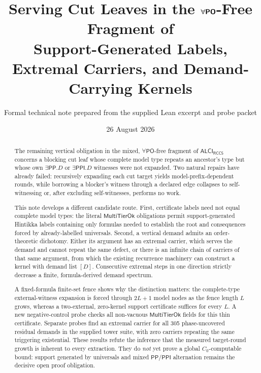 \documentclass[11pt,letterpaper]{article}
\title{\vspace{-1.5em}\textbf{Serving Cut Leaves in the $\boldsymbol{\forall\PO}$-Free Fragment of \ALCIRCC}\\[0.5em]
\large Support-Generated Labels, Extremal Carriers, and Demand-Carrying Kernels}
\author{Formal technical note prepared from the supplied Lean excerpt and probe packet}
\date{26 August 2026}
\newcommand{\ALCIRCC}{\ensuremath{\mathsf{ALCI}_{\mathsf{RCC5}}}}
\newcommand{\PO}{\ensuremath{\mathsf{PO}}}
\newcommand{\PP}{\ensuremath{\mathsf{PP}}}
\newcommand{\PPI}{\ensuremath{\mathsf{PPI}}}
\newcommand{\MultiTierOk}{\ensuremath{\mathsf{MultiTierOk}}}
\theoremstyle{definition}
\theoremstyle{plain}
\theoremstyle{remark}
\begin{document}
\maketitle

\begin{abstract}
The remaining vertical obligation in the mixed, $\forall\PO$-free fragment of
\ALCIRCC{} concerns a blocking cut leaf whose complete model type repeats an
ancestor's type but whose own $\exists\PP.D$ or $\exists\PPI.D$ witnesses were
not expanded.  Two natural repairs have already failed: recursively expanding
each cut target yields model-prefix-dependent rounds, while borrowing a
blocker's witness through a declared edge collapses to self-witnessing or,
after excluding self-witnesses, performs no work.

This note develops a different candidate route.  First, certificate labels need
not equal complete model types: the literal \MultiTierOk{} obligations permit
support-generated Hintikka labels containing only formulas needed to establish
the root and consequences forced by already-labelled universals.  Second, a
vertical demand admits an order-theoretic dichotomy.  Either its argument has an
extremal carrier, which serves the demand and cannot repeat the same defect, or
there is an infinite chain of carriers of that same argument, from which the
existing recurrence machinery can construct a kernel with demand list
$[D]$.  Consecutive extremal steps in one direction strictly decrease a finite,
formula-derived demand spectrum.

A fixed-formula finite-set fence shows why the distinction matters: the
complete-type external-witness expansion is forced through $2L+1$ model nodes
as the fence length $L$ grows, whereas a two-external, zero-kernel support
certificate suffices for every $L$.  A new negative-control probe checks all non-vacuous
\MultiTierOk{} fields for this thin certificate.  Separate probes find an
extremal carrier for all 305 phase-uncovered residual demands in the supplied
tower suite, with zero carriers repeating the same triggering existential.
These results refute the inference that the measured target-round growth is
inherent to every extraction.  They do \emph{not} yet prove a global
$C_0$-computable bound: support generated by universals and mixed
\PP/\PPI{} alternation remains the decisive open proof obligation.
\end{abstract}
\end{document}
